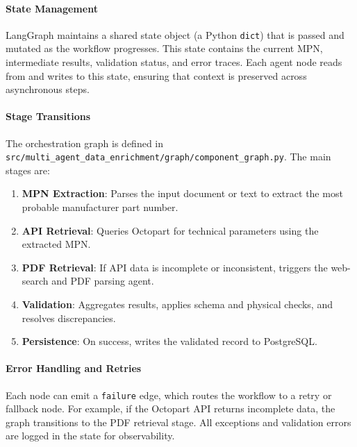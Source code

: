 \paragraph{State Management}
LangGraph maintains a shared state object (a Python \texttt{dict}) that is passed and mutated as the workflow progresses. This state contains the current MPN, intermediate results, validation status, and error traces. Each agent node reads from and writes to this state, ensuring that context is preserved across asynchronous steps.

\paragraph{Stage Transitions}
The orchestration graph is defined in \texttt{src/multi\_agent\_data\_enrichment/graph/component\_graph.py}. The main stages are:
\begin{enumerate}
  \item \textbf{MPN Extraction}: Parses the input document or text to extract the most probable manufacturer part number.
  \item \textbf{API Retrieval}: Queries Octopart for technical parameters using the extracted MPN.
  \item \textbf{PDF Retrieval}: If API data is incomplete or inconsistent, triggers the web-search and PDF parsing agent.
  \item \textbf{Validation}: Aggregates results, applies schema and physical checks, and resolves discrepancies.
  \item \textbf{Persistence}: On success, writes the validated record to PostgreSQL.
\end{enumerate}

\paragraph{Error Handling and Retries}
Each node can emit a \texttt{failure} edge, which routes the workflow to a retry or fallback node. For example, if the Octopart API returns incomplete data, the graph transitions to the PDF retrieval stage. All exceptions and validation errors are logged in the state for observability.


